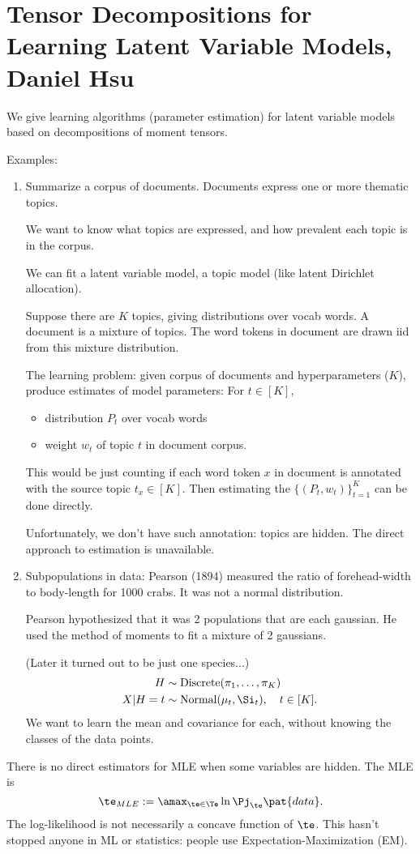 \section{	Tensor Decompositions for Learning Latent Variable Models, Daniel Hsu}

We give learning algorithms (parameter estimation) for latent variable models based on decompositions of moment tensors.

Examples:
\begin{enumerate}
\item
Summarize a corpus of documents. Documents express one or more thematic topics.

We want to know what topics are expressed, and how prevalent each topic is in the corpus. 

We can fit a latent variable model, a topic model (like latent Dirichlet allocation). 

Suppose there are $K$ topics, giving distributions over vocab words. A document is a mixture of topics. The word tokens in document are drawn iid from this mixture distribution.

The learning problem: given corpus of documents and hyperparameters ($K$), produce estimates of model parameters: For $t\in [K]$,
\begin{itemize}
\item
distribution $P_t$ over vocab words
\item
weight $w_t$ of topic $t$ in document corpus.
\end{itemize}
This would be just counting if each word token $x$ in document is annotated with the source topic $t_x\in [K]$. Then estimating the $\{(P_t,w_t)\}_{t=1}^K$ can be done directly.

Unfortunately, we don't have such annotation: topics are hidden. The direct approach to estimation is unavailable.
\item
Subpopulations in data: Pearson (1894) measured the ratio of forehead-width to body-length for 1000 crabs. It was not a normal distribution.

Pearson hypothesized that it was 2 populations that are each gaussian. He used the method of moments to fit a mixture of 2 gaussians.

(Later it turned out to be just one species...)
\begin{align}
H&\sim \text{Discrete}(\pi_1,\ldots, \pi_K)\\
X|H=t&\sim \text{Normal}(\mu_t,\Si_t),\quad t\in [K].
\end{align}
We want to learn the mean and covariance for each, without knowing the classes of the data points.
\end{enumerate}
There is no direct estimators for MLE when some variables are hidden. The MLE is
$$
\te_{MLE}:= \amax_{\te\in \Te} \ln \Pj_\te\pat{data}.
$$
The log-likelihood is not necessarily a concave function of $\te$. This hasn't stopped anyone in ML or statistics: people use Expectation-Maximization (EM).

